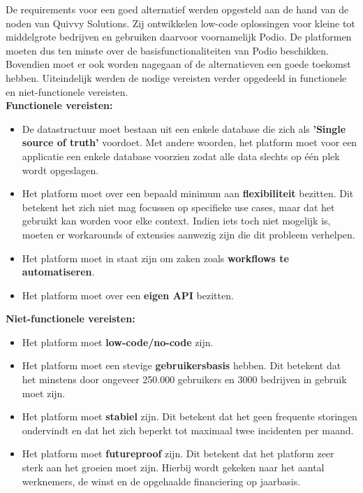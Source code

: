 De requirements voor een goed alternatief werden opgesteld aan de hand van de noden van Quivvy Solutions. Zij ontwikkelen low-code oplossingen voor kleine tot middelgrote bedrijven en gebruiken daarvoor voornamelijk Podio. De platformen moeten dus ten minste over de basisfunctionaliteiten van Podio beschikken. Bovendien moet er ook worden nagegaan of de alternatieven een goede toekomst hebben. Uiteindelijk werden de nodige vereisten verder opgedeeld in functionele en niet-functionele vereisten. \\

\textbf{Functionele vereisten:}

\begin{itemize}
    \item De datastructuur moet bestaan uit een enkele database die zich als \textbf{'Single source of truth'} voordoet. Met andere woorden, het platform moet voor een applicatie een enkele database voorzien zodat alle data slechts op één plek wordt opgeslagen.
    \item Het platform moet over een bepaald minimum aan \textbf{flexibiliteit} bezitten. Dit betekent het zich niet mag focussen op specifieke use cases, maar dat het gebruikt kan worden voor elke context. Indien iets toch niet mogelijk is, moeten er workarounds of extensies aanwezig zijn die dit probleem verhelpen.
    \item Het platform moet in staat zijn om zaken zoals \textbf{workflows te automatiseren}.
    \item Het platform moet over een \textbf{eigen API} bezitten.
\end{itemize}

\textbf{Niet-functionele vereisten:} 

\begin{itemize}
    \item Het platform moet \textbf{low-code/no-code} zijn.
    \item Het platform moet een stevige \textbf{gebruikersbasis} hebben. Dit betekent dat het minstens door ongeveer 250.000 gebruikers en 3000 bedrijven in gebruik moet zijn.
    \item Het platform moet \textbf{stabiel} zijn. Dit betekent dat het geen frequente storingen ondervindt en dat het zich beperkt tot maximaal twee incidenten per maand.
    \item Het platform moet \textbf{futureproof} zijn. Dit betekent dat het platform zeer sterk aan het groeien moet zijn. Hierbij wordt gekeken naar het aantal werknemers, de winst en de opgehaalde financiering op jaarbasis.
\end{itemize}



